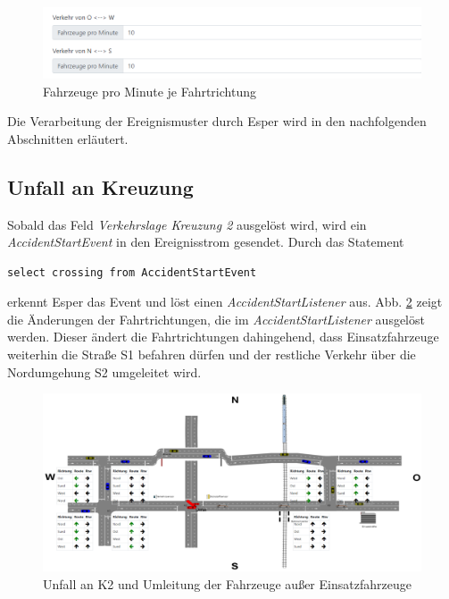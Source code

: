 \begin{figure}[ht]
\begin{center}
	\includegraphics[width=\textwidth]{images/verkehrsstrom.png}
	\caption{Fahrzeuge pro Minute je Fahrtrichtung}
	\label{fig12}
\end{center}
\end{figure}

Die Verarbeitung der Ereignismuster durch Esper wird in den nachfolgenden Abschnitten erläutert.
\subsection{Unfall an Kreuzung} \label{accident}

Sobald das Feld \textit{Verkehrslage Kreuzung 2} ausgelöst wird, wird ein \textit{AccidentStartEvent} in den Ereignisstrom gesendet. Durch das Statement 

\begin{lstlisting}
select crossing from AccidentStartEvent
\end{lstlisting}

erkennt Esper das Event und löst einen \textit{AccidentStartListener} aus. Abb. \ref{fig6} zeigt die Änderungen der Fahrtrichtungen, die im \textit{AccidentStartListener} ausgelöst werden.  
Dieser ändert die Fahrtrichtungen dahingehend, dass Einsatzfahrzeuge weiterhin die Straße S1 befahren dürfen und der restliche Verkehr über die Nordumgehung S2 umgeleitet wird. 

\begin{figure}[ht]
	\includegraphics[width=\textwidth]{images/Accident.png}
	\caption{Unfall an K2 und Umleitung der Fahrzeuge außer Einsatzfahrzeuge}
	\label{fig6}
\end{figure}

